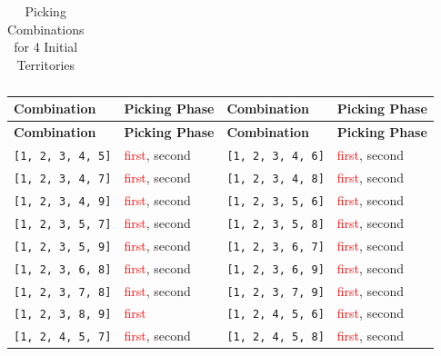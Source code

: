 \begin{longtable}{|p{2.5cm}|p{2.5cm}||p{2.5cm}|p{2.5cm}|}
\caption{Picking Combinations for 4 Initial Territories}
\label{tab:4territories}
\end{longtable}

\normalsize

\small
\begin{longtable}{|p{3.5cm}|p{2.5cm}||p{3.5cm}|p{2.5cm}|}
\hline
\rowcolor{black!20}
\textbf{Combination} & \textbf{Picking Phase} & \textbf{Combination} & \textbf{Picking Phase} \\ \hline
\endfirsthead

\hline
\rowcolor{black!20}
\textbf{Combination} & \textbf{Picking Phase} & \textbf{Combination} & \textbf{Picking Phase} \\ \hline
\endhead

\texttt{[1, 2, 3, 4, 5]} & \textcolor{red}{first}, \textcolor{CustomBlue}{second} & \texttt{[1, 2, 3, 4, 6]} & \textcolor{red}{first}, \textcolor{CustomBlue}{second} \\ \hline
\texttt{[1, 2, 3, 4, 7]} & \textcolor{red}{first}, \textcolor{CustomBlue}{second} & \texttt{[1, 2, 3, 4, 8]} & \textcolor{red}{first}, \textcolor{CustomBlue}{second} \\ \hline
\texttt{[1, 2, 3, 4, 9]} & \textcolor{red}{first}, \textcolor{CustomBlue}{second} & \texttt{[1, 2, 3, 5, 6]} & \textcolor{red}{first}, \textcolor{CustomBlue}{second} \\ \hline
\texttt{[1, 2, 3, 5, 7]} & \textcolor{red}{first}, \textcolor{CustomBlue}{second} & \texttt{[1, 2, 3, 5, 8]} & \textcolor{red}{first}, \textcolor{CustomBlue}{second} \\ \hline
\texttt{[1, 2, 3, 5, 9]} & \textcolor{red}{first}, \textcolor{CustomBlue}{second} & \texttt{[1, 2, 3, 6, 7]} & \textcolor{red}{first}, \textcolor{CustomBlue}{second} \\ \hline
\texttt{[1, 2, 3, 6, 8]} & \textcolor{red}{first}, \textcolor{CustomBlue}{second} & \texttt{[1, 2, 3, 6, 9]} & \textcolor{red}{first}, \textcolor{CustomBlue}{second} \\ \hline
\texttt{[1, 2, 3, 7, 8]} & \textcolor{red}{first}, \textcolor{CustomBlue}{second} & \texttt{[1, 2, 3, 7, 9]} & \textcolor{red}{first}, \textcolor{CustomBlue}{second} \\ \hline
\texttt{[1, 2, 3, 8, 9]} & \textcolor{red}{first} & \texttt{[1, 2, 4, 5, 6]} & \textcolor{red}{first}, \textcolor{CustomBlue}{second} \\ \hline
\texttt{[1, 2, 4, 5, 7]} & \textcolor{red}{first}, \textcolor{CustomBlue}{second} & \texttt{[1, 2, 4, 5, 8]} & \textcolor{red}{first}, \textcolor{CustomBlue}{second} \\ \hline

\end{longtable}
